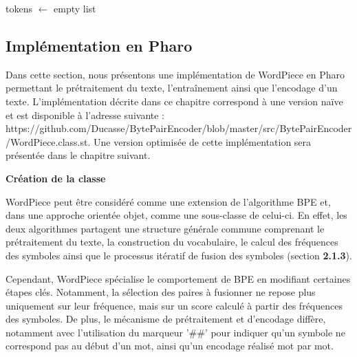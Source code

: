 \documentclass[12pt,a4paper]{report}
\begin{document}
	\begin{algorithm}[H]
		\caption{EncodeWord}
		
		
		tokens $\leftarrow$ empty list\;
		
		
		
	\end{algorithm}
	
	\subsection{Implémentation en Pharo}
	
	Dans cette section, nous présentons une implémentation de WordPiece en Pharo permettant le prétraitement du texte, l’entraînement ainsi que l’encodage d’un texte. L’implémentation décrite dans ce chapitre correspond à une version naïve et est disponible à l’adresse suivante : https://github.com/Ducasse/BytePairEncoder/blob/master/src/BytePairEncoder/WordPiece.class.st. Une version optimisée de cette implémentation sera présentée dans le chapitre suivant.
	
	\textbf{Création de la classe}
	
		WordPiece peut être considéré comme une extension de l’algorithme BPE et, dans une approche orientée objet, comme une sous-classe de celui-ci. En effet, les deux algorithmes partagent une structure générale commune comprenant le prétraitement du texte, la construction du vocabulaire, le calcul des fréquences des symboles ainsi que le processus itératif de fusion des symboles (section \textbf{2.1.3}).
		
		Cependant, WordPiece spécialise le comportement de BPE en modifiant certaines étapes clés. Notamment, la sélection des paires à fusionner ne repose plus uniquement sur leur fréquence, mais sur un score calculé à partir des fréquences des symboles. De plus, le mécanisme de prétraitement et d’encodage diffère, notamment avec l’utilisation du marqueur '\#\#' pour indiquer qu’un symbole ne correspond pas au début d’un mot, ainsi qu’un encodage réalisé mot par mot.
		
\end{document}
